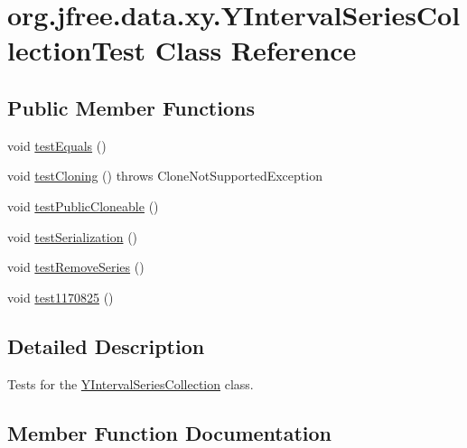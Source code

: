 \hypertarget{classorg_1_1jfree_1_1data_1_1xy_1_1_y_interval_series_collection_test}{}\section{org.\+jfree.\+data.\+xy.\+Y\+Interval\+Series\+Collection\+Test Class Reference}
\label{classorg_1_1jfree_1_1data_1_1xy_1_1_y_interval_series_collection_test}
\subsection*{Public Member Functions}
\begin{DoxyCompactItemize}
\item 
void \mbox{\hyperlink{classorg_1_1jfree_1_1data_1_1xy_1_1_y_interval_series_collection_test_a430c17d89f7a72e7c9cfa04ec81d6146}{test\+Equals}} ()
\item 
void \mbox{\hyperlink{classorg_1_1jfree_1_1data_1_1xy_1_1_y_interval_series_collection_test_a7fc7d4f3578c9489c334f51587a60186}{test\+Cloning}} ()  throws Clone\+Not\+Supported\+Exception 
\item 
void \mbox{\hyperlink{classorg_1_1jfree_1_1data_1_1xy_1_1_y_interval_series_collection_test_af37461f3f5596fc1c4c823982641244a}{test\+Public\+Cloneable}} ()
\item 
void \mbox{\hyperlink{classorg_1_1jfree_1_1data_1_1xy_1_1_y_interval_series_collection_test_a9761f34fb5d7e535518f6d9609af4ae2}{test\+Serialization}} ()
\item 
void \mbox{\hyperlink{classorg_1_1jfree_1_1data_1_1xy_1_1_y_interval_series_collection_test_ae26dd6d34afcc25ac30d5ab12bfa73ac}{test\+Remove\+Series}} ()
\item 
void \mbox{\hyperlink{classorg_1_1jfree_1_1data_1_1xy_1_1_y_interval_series_collection_test_a92dcb5105ec74dc646a634fc0ed55da6}{test1170825}} ()
\end{DoxyCompactItemize}


\subsection{Detailed Description}
Tests for the \mbox{\hyperlink{classorg_1_1jfree_1_1data_1_1xy_1_1_y_interval_series_collection}{Y\+Interval\+Series\+Collection}} class. 

\subsection{Member Function Documentation}
\mbox{\label{classorg_1_1jfree_1_1data_1_1xy_1_1_y_interval_series_collection_test_a92dcb5105ec74dc646a634fc0ed55da6}} 
